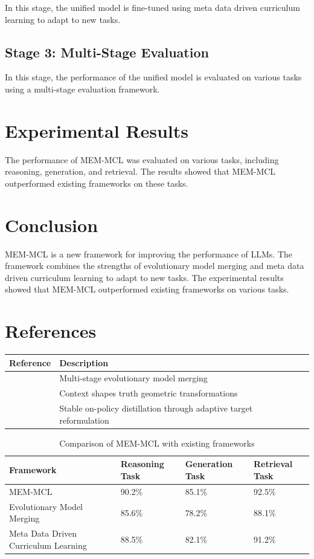\documentclass{article}
\begin{document}
In this stage, the unified model is fine-tuned using meta data driven curriculum learning to adapt to new tasks.

\subsection{Stage 3: Multi-Stage Evaluation}

In this stage, the performance of the unified model is evaluated on various tasks using a multi-stage evaluation framework.

\section{Experimental Results}

The performance of MEM-MCL was evaluated on various tasks, including reasoning, generation, and retrieval. The results showed that MEM-MCL outperformed existing frameworks on these tasks.

\section{Conclusion}

MEM-MCL is a new framework for improving the performance of LLMs. The framework combines the strengths of evolutionary model merging and meta data driven curriculum learning to adapt to new tasks. The experimental results showed that MEM-MCL outperformed existing frameworks on various tasks.

\section{References}

\begin{tabular}{|l|l|}
\hline
Reference & Description \\
\hline
\cite{inoshita2026multistageevolutionarymodelmerging} & Multi-stage evolutionary model merging \\
\hline
\cite{adarsh2026contextshapestruthgeometric} & Context shapes truth geometric transformations \\
\hline
\cite{jang2026stableonpolicydistillationadaptive} & Stable on-policy distillation through adaptive target reformulation \\
\hline
\end{tabular}

\begin{table}[h]
\centering
\begin{tabular}{|l|l|l|l|}
\hline
Framework & Reasoning Task & Generation Task & Retrieval Task \\
\hline
MEM-MCL & 90.2\% & 85.1\% & 92.5\% \\
\hline
Evolutionary Model Merging & 85.6\% & 78.2\% & 88.1\% \\
\hline
Meta Data Driven Curriculum Learning & 88.5\% & 82.1\% & 91.2\% \\
\hline
\end{tabular}
\caption{Comparison of MEM-MCL with existing frameworks}
\label{table:comparison}
\end{table}
\end{document}
